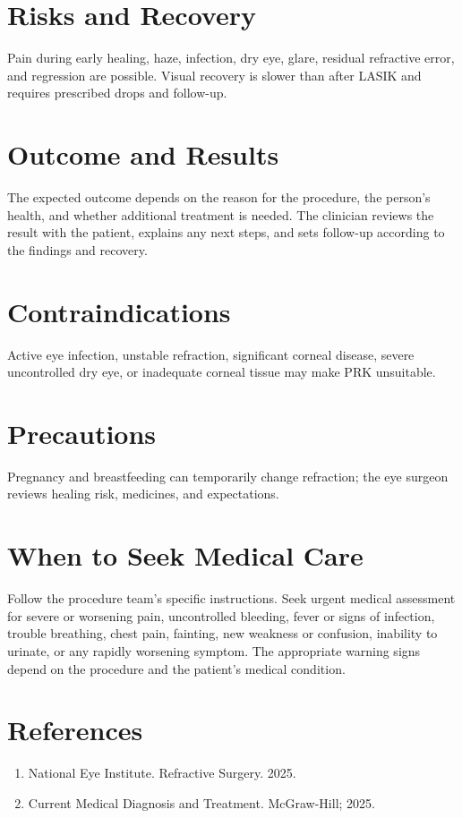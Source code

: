\section*{Risks and Recovery}
Pain during early healing, haze, infection, dry eye, glare, residual refractive error, and regression are possible. Visual recovery is slower than after LASIK and requires prescribed drops and follow-up.

\section*{Outcome and Results}
The expected outcome depends on the reason for the procedure, the person's health, and whether additional treatment is needed. The clinician reviews the result with the patient, explains any next steps, and sets follow-up according to the findings and recovery.

\section*{Contraindications}
Active eye infection, unstable refraction, significant corneal disease, severe uncontrolled dry eye, or inadequate corneal tissue may make PRK unsuitable.

\section*{Precautions}
Pregnancy and breastfeeding can temporarily change refraction; the eye surgeon reviews healing risk, medicines, and expectations.

\section*{When to Seek Medical Care}
Follow the procedure team's specific instructions. Seek urgent medical assessment for severe or worsening pain, uncontrolled bleeding, fever or signs of infection, trouble breathing, chest pain, fainting, new weakness or confusion, inability to urinate, or any rapidly worsening symptom. The appropriate warning signs depend on the procedure and the patient's medical condition.

\section*{References}
\begin{enumerate}
  \item National Eye Institute. Refractive Surgery. 2025.
  \item Current Medical Diagnosis and Treatment. McGraw-Hill; 2025.
\end{enumerate}
\clearpage
